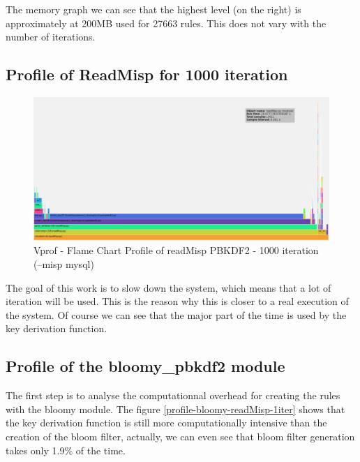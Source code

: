\documentclass{eplmastersthesis}
\begin{document}
The memory graph we can see that the highest level (on the right) is approximately at 200MB used for 27663 rules. This does not vary with the number of iterations.\\ 

\subsection{Profile of ReadMisp for 1000 iteration}

\begin{figure}[h!]
\begin{center}
	\includegraphics[scale=0.3]{res/profile-1000iter}
	\caption{Vprof - Flame Chart Profile of readMisp PBKDF2 - 1000 iteration (--misp mysql)}
	\label{profile-readMisp1000}
\end{center}
\end{figure}

The goal of this work is to slow down the system, which means that a lot of iteration will be used. This is the reason why this is closer to a real execution of the system. Of course we can see that the major part of the time is used by the key derivation function.\\

\subsection{Profile of the bloomy\_pbkdf2 module}
The first step is to analyse the computationnal overhead for creating the rules with the bloomy module. The figure \ref{profile-bloomy-readMisp-1iter} shows that the key derivation function is still more computationally intensive than the creation of the bloom filter, actually, we can even see that bloom filter generation takes only 1.9\% of the time.\\
\end{document}
